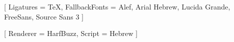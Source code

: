 %
%
%


\usepackage{iftex}
\RequireXeTeX

\usepackage{fontspec}



\usepackage{fontspec}
\setmainfont{Source Sans 3}[
  Ligatures    = TeX,
  FallbackFonts = {Alef, Arial Hebrew, Lucida Grande, FreeSans, Source Sans 3}
]



\usepackage{fontspec}


\newfontfamily{}[
  Renderer = HarfBuzz,
  Script   = Hebrew
]

